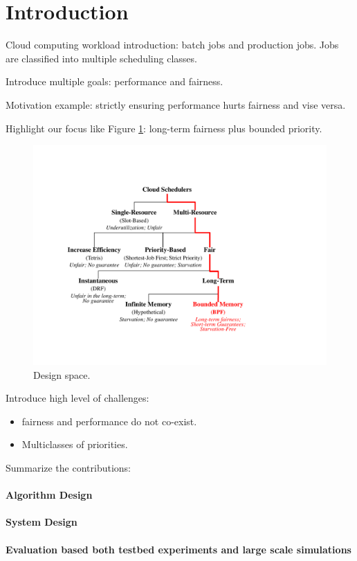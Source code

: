 \section{Introduction}

Cloud computing workload introduction: batch jobs and production jobs. Jobs are classified into multiple scheduling classes.

Introduce multiple goals: performance and fairness.

Motivation example: strictly ensuring performance hurts fairness and vise versa.

Highlight our focus like Figure \ref{fig:Design-Space}: long-term fairness plus bounded priority.

\begin{figure}[th]
\centering
\includegraphics[width=1.0\linewidth]{fig/Design-Space}
\caption{Design space.}
\label{fig:Design-Space}
\end{figure}

Introduce high level of challenges:
\begin{itemize}
	\item[1.] fairness and performance do not co-exist.
	\item[2.] Multiclasses of priorities.
\end{itemize}

Summarize the contributions:

\paragraph{Algorithm Design}

\paragraph{System Design}

\paragraph{Evaluation based both testbed experiments and large scale simulations}


